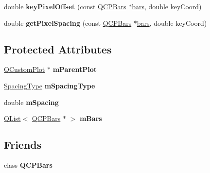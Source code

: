 \begin{DoxyCompactItemize}
\item 
double {\bfseries key\+Pixel\+Offset} (const \hyperlink{class_q_c_p_bars}{Q\+C\+P\+Bars} $\ast$\hyperlink{class_q_c_p_bars_group_a7c72ed1f8cd962c93b8c42ab96cd91ec}{bars}, double key\+Coord)\hypertarget{class_q_c_p_bars_group_a8e2ca6002e7bab49670144d048a2bcc9}{}\label{class_q_c_p_bars_group_a8e2ca6002e7bab49670144d048a2bcc9}

\item 
double {\bfseries get\+Pixel\+Spacing} (const \hyperlink{class_q_c_p_bars}{Q\+C\+P\+Bars} $\ast$\hyperlink{class_q_c_p_bars_group_a7c72ed1f8cd962c93b8c42ab96cd91ec}{bars}, double key\+Coord)\hypertarget{class_q_c_p_bars_group_a0beccd41bc3841a4c5b284823bc7d2de}{}\label{class_q_c_p_bars_group_a0beccd41bc3841a4c5b284823bc7d2de}

\end{DoxyCompactItemize}
\subsection*{Protected Attributes}
\begin{DoxyCompactItemize}
\item 
\hyperlink{class_q_custom_plot}{Q\+Custom\+Plot} $\ast$ {\bfseries m\+Parent\+Plot}\hypertarget{class_q_c_p_bars_group_a32ae4b78f87bd225a604e73a4ae9be83}{}\label{class_q_c_p_bars_group_a32ae4b78f87bd225a604e73a4ae9be83}

\item 
\hyperlink{class_q_c_p_bars_group_a4c0521120a97e60bbca37677a37075b6}{Spacing\+Type} {\bfseries m\+Spacing\+Type}\hypertarget{class_q_c_p_bars_group_a6794ee1a9c81864d627bff6a4b2d64ec}{}\label{class_q_c_p_bars_group_a6794ee1a9c81864d627bff6a4b2d64ec}

\item 
double {\bfseries m\+Spacing}\hypertarget{class_q_c_p_bars_group_a56471d7f548ca6141b7a5bf9629f7ece}{}\label{class_q_c_p_bars_group_a56471d7f548ca6141b7a5bf9629f7ece}

\item 
\hyperlink{class_q_list}{Q\+List}$<$ \hyperlink{class_q_c_p_bars}{Q\+C\+P\+Bars} $\ast$ $>$ {\bfseries m\+Bars}\hypertarget{class_q_c_p_bars_group_afdf50d0fcb5322b9fcf51c39660c066e}{}\label{class_q_c_p_bars_group_afdf50d0fcb5322b9fcf51c39660c066e}

\end{DoxyCompactItemize}
\subsection*{Friends}
\begin{DoxyCompactItemize}
\item 
class {\bfseries Q\+C\+P\+Bars}\hypertarget{class_q_c_p_bars_group_ad54ecefadd1efdfcaca605dba1fcc7c2}{}\label{class_q_c_p_bars_group_ad54ecefadd1efdfcaca605dba1fcc7c2}

\end{DoxyCompactItemize}



